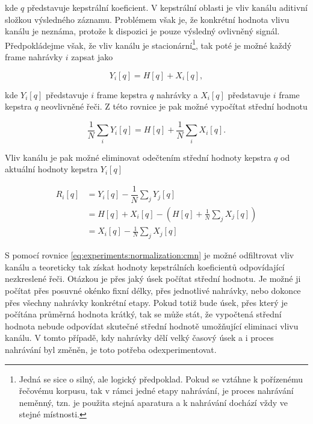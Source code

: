 \noindent kde $q$ představuje kepstrální koeficient. V kepstrální oblasti je vliv kanálu aditivní složkou výsledného záznamu. Problémem však je, že konkrétní hodnota vlivu kanálu je neznáma, protože k dispozici je pouze výsledný ovlivněný signál. Předpokládejme však, že vliv kanálu je stacionární\footnote{Jedná se sice o silný, ale logický předpoklad. Pokud se vztáhne k pořízenému řečovému korpusu, tak v rámci jedné etapy nahrávání, je proces nahrávání neměnný, tzn. je použita stejná aparatura a k nahrávání dochází vždy ve stejné místnosti.}, tak poté je možné každý frame nahrávky $i$ zapsat jako

\begin{equation}
  Y_i\left[q\right] = H\left[q\right] + X_i\left[q\right],
\end{equation}

\noindent kde $Y_i\left[q\right]$ představuje $i$ frame kepstra $q$ nahrávky a $X_i\left[q\right]$ představuje $i$ frame kepstra $q$ neovlivněné řeči. Z této rovnice je pak možné vypočítat střední hodnotu

\begin{equation}
  \frac{1}{N} \sum_i Y_i\left[q\right] = H\left[q\right] + \frac{1}{N} \sum_i X_i\left[q\right].
\end{equation}

\noindent Vliv kanálu je pak možné eliminovat odečtením střední hodnoty kepstra $q$ od aktuální hodnoty kepstra $Y_i\left[q\right]$

\begin{align}
  R_i\left[q\right] &= Y_i\left[q\right] - \dfrac{1}{N}\sum_{j} Y_j\left[q\right] \nonumber  \\
  &= H\left[q\right] + X_i\left[q\right] - \left( H\left[q\right] + \frac{1}{N} \sum_j X_j\left[q\right] \right) \nonumber  \\
  &= X_i\left[q\right] - \frac{1}{N} \sum_j X_j\left[q\right]
  \label{eq:experiments:normalization:cmn}
\end{align}

\noindent S pomocí rovnice \ref{eq:experiments:normalization:cmn} je možné odfiltrovat vliv kanálu a teoreticky tak získat hodnoty kepstrálních koeficientů odpovídající nezkreslené řeči. Otázkou je přes jaký úsek počítat střední hodnotu. Je možné ji počítat přes posuvné okénko fixní délky, přes jednotlivé nahrávky, nebo dokonce přes všechny nahrávky konkrétní etapy. Pokud totiž bude úsek, přes který je počítána průměrná hodnota krátký, tak se může stát, že vypočtená střední hodnota nebude odpovídat skutečné střední hodnotě umožňující eliminaci vlivu kanálu. V tomto případě, kdy nahrávky dělí velký časový úsek a i proces nahrávání byl změněn, je toto potřeba odexperimentovat.

